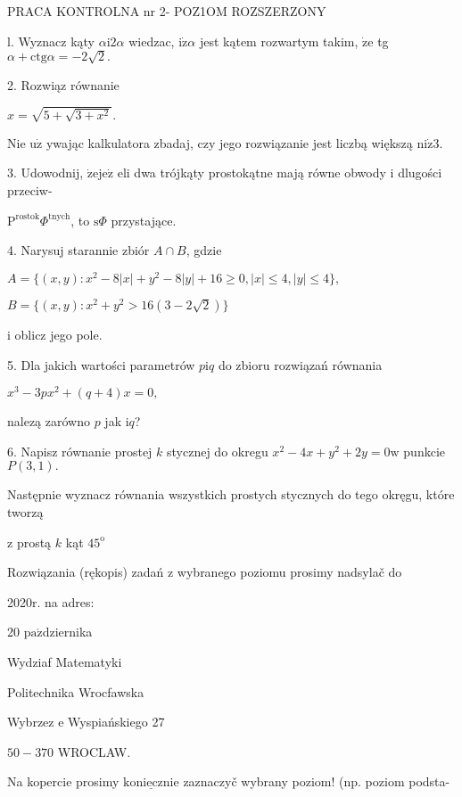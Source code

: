 \documentclass[a4paper,12pt]{article}
\begin{document}
PRACA KONTROLNA nr 2- POZ1OM ROZSZERZONY

l. Wyznacz kąty $\alpha \mathrm{i}2\alpha$ wiedzac, $\mathrm{i}\dot{\mathrm{z}}\alpha$ jest kątem rozwartym takim, $\dot{\mathrm{z}}\mathrm{e}$ tg $\alpha+\mathrm{c}\mathrm{t}\mathrm{g}\alpha=-2\sqrt{2}.$

2. Rozwiąz równanie

$x=\sqrt{5+\sqrt{3+x^{2}}}.$

Nie $\mathrm{u}\dot{\mathrm{z}}$ ywając kalkulatora zbadaj, czy jego rozwiązanie jest liczbą większą $\mathrm{n}\mathrm{i}\dot{\mathrm{z}}3.$

3. Udowodnij, $\dot{\mathrm{z}}\mathrm{e}\mathrm{j}\mathrm{e}\dot{\mathrm{z}}$ eli dwa trójkąty prostokątne mają równe obwody $\mathrm{i}$ dlugości przeciw-

$\mathrm{P}^{\mathrm{r}\mathrm{o}\mathrm{s}\mathrm{t}\mathrm{o}\mathrm{k}}\Phi^{\mathrm{t}\mathrm{n}\mathrm{y}\mathrm{c}\mathrm{h}}$, to $\mathrm{s}\Phi$ przystające.

4. Narysuj starannie zbiór $A\cap B$, gdzie

$A=\{(x,y):x^{2}-8|x|+y^{2}-8|y|+16\geq 0,|x|\leq 4,|y|\leq 4\},$

$B=\{(x,y):x^{2}+y^{2}>16(3-2\sqrt{2})\}$

$\mathrm{i}$ oblicz jego pole.

5. Dla jakich wartości parametrów $p\mathrm{i}q$ do zbioru rozwiązań równania

$x^{3}-3px^{2}+(q+4)x=0,$

nalezą zarówno $p$ jak $\mathrm{i}q$?

6. Napisz równanie prostej $k$ stycznej do okregu $x^{2}-4x+y^{2}+2y=0\mathrm{w}$ punkcie $P(3,1).$

Następnie wyznacz równania wszystkich prostych stycznych do tego okręgu, które tworzą

$\mathrm{z}$ prostą $k$ kąt $45^{\mathrm{o}}$

Rozwiązania (rękopis) zadań z wybranego poziomu prosimy nadsylač do

2020r. na adres:

20 $\mathrm{p}\mathrm{a}\acute{\mathrm{z}}$dziernika

Wydziaf Matematyki

Politechnika Wrocfawska

Wybrzez $\mathrm{e}$ Wyspiańskiego 27

$50-370$ WROCLAW.

Na kopercie prosimy $\underline{\mathrm{k}\mathrm{o}\mathrm{n}\mathrm{i}\mathrm{e}\mathrm{c}\mathrm{z}\mathrm{n}\mathrm{i}\mathrm{e}}$ zaznaczyč wybrany poziom! (np. poziom podsta-
\end{document}
